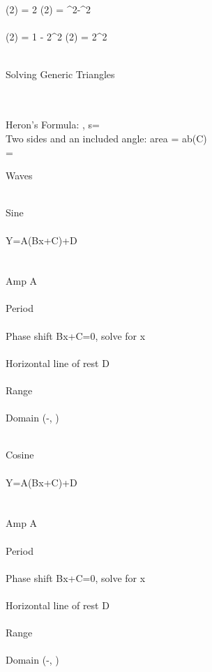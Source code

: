 \documentclass[12pt]{article}
\begin{document}
\begin{center}
\normalsize
\\~\\
\sin (2\theta) = 2\sin \theta \cos \theta \hspace{10mm}
\cos (2\theta) = \cos^2\theta-\sin^2 \theta
\\~\\
\cos (2\theta) = 1 - 2\sin^2\theta \hspace{10mm}
\cos (2\theta) = 2\cos^2

\\[.75in]
\large
Solving Generic Triangles

\normalsize
\\~\\
Heron's Formula: , \hspace{5mm}s=\\[.4in]
Two sides and an included angle: area = ab\sin(C)\\[.4in]
=




\pagebreak
\Large
Waves

\\[.5in]
\large
Sine
\normalsize
\\~\\

Y=A\sin(Bx+C)+D\\
\\~\\
Amp \Rightarrow \abs A
\\~\\
Period \Rightarrow {}
\\~\\
Phase shift \Rightarrow Bx+C=0, solve for x
\\~\\
Horizontal line of rest \Rightarrow D
\\~\\
Range 
\\~\\
Domain \Rightarrow (-\infty, \infty)

\\[.75in]
\large
Cosine
\normalsize
\\~\\

Y=A\cos(Bx+C)+D\\
\\~\\
Amp \Rightarrow \abs A
\\~\\
Period \Rightarrow {}
\\~\\
Phase shift \Rightarrow Bx+C=0, solve for x
\\~\\
Horizontal line of rest \Rightarrow D
\\~\\
Range 
\\~\\
Domain \Rightarrow (-\infty, \infty)


\end{center}
\end{document}
